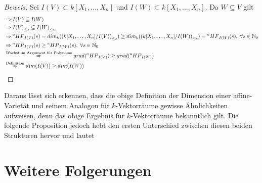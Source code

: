 \documentclass{article}
\newcommand*{\R}{k[X_{1},\ldots,X_{n}]}
\newcommand*{\indx}[2]{{#1}_{#2}}
\newcommand*{\N}{\mathbb{N}_0}
\newcommand*{\hf}[1]{$\prescript{a}{}{HF}_{#1}$}
\newcommand*{\hp}[1]{$\prescript{a}{}{HP}_{#1}$}
\begin{document}
\begin{proof}[Beweis]
	Sei $I(V)\subset\R$ und $I(W)\subset\R$. Da $W\subseteq V$ gilt
	\begin{align*}
	 &\Rightarrow I(V)\subseteq I(W)\\ & 
	  \Rightarrow \indx{I(V)}{\leq s}\subseteq \indx{I(W)}{\leq s}\\&
	  \Rightarrow \textnormal{\hf{I(V)}}(s)=\indx{dim}{k}(\indx{(\R/I(V))}{\leq s})\geq \indx{dim}{k}(\indx{(\R/I(W))}{\leq s})= \textnormal{\hf{I(W)}}(s),\; \forall s\in \N \\&
	  \Rightarrow \textnormal{\hp{I(V)}}(s) \geq \textnormal{\hp{I(W)}}(s),\; \forall s\in \N \\&
	  \stackrel{\textnormal{Wachstum Argument für Polynome}}{\Rightarrow}grad(\textnormal{\hp{I(V)}}) \geq grad(\textnormal{\hp{I(W)}}) \\&
	  \stackrel{\textnormal{Definition}}{\Rightarrow} dim(I(V))\geq dim(I(W))
	\end{align*}
\end{proof}
Daraus lässt sich erkennen, dass die obige Definition der Dimension einer affine-Varietät und seinem Analogon für $k$-Vektorräume gewisse Ähnlichkeiten aufweisen, denn das obige Ergebnis für $k$-Vektorräume bekanntlich gilt. Die folgende Proposition jedoch hebt den ersten Unterschied zwischen diesen beiden Strukturen hervor und lautet

\section{Weitere Folgerungen}
\end{document}
